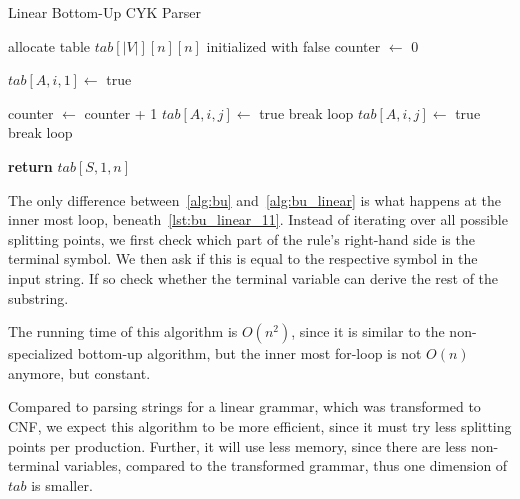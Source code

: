 \begin{algorithm}[H]
    \caption{Linear Bottom-Up CYK Parser}
    \label{alg:bu_linear}
    \begin{algorithmic}[1]
        \State allocate table $tab[|V|][n][n]$ initialized with false
        \State counter $\leftarrow$ 0
    
                \State $tab[A,i,1] \leftarrow$ true
            \EndFor
        \EndFor

                    \State counter $\leftarrow$ counter + 1 \label{lst:bu_linear_11}
                            \State $tab[A,i,j]\leftarrow$ true
                            \State break loop
                        \EndIf
                    \Else
                            \State $tab[A,i,j]\leftarrow$ true
                            \State break loop
                        \EndIf
                    \EndIf
                \EndFor
            \EndFor
        \EndFor

        \State \textbf{return} $tab[S,1,n]$
        \EndFunction
    \end{algorithmic}
\end{algorithm}

The only difference between~\cref{alg:bu} and~\cref{alg:bu_linear} is what happens at the inner most loop, beneath~\cref{lst:bu_linear_11}.
Instead of iterating over all possible splitting points, we first check which part of the rule's right-hand side is the terminal symbol.
We then ask if this is equal to the respective symbol in the input string.
If so check whether the terminal variable can derive the rest of the substring.

The running time of this algorithm is $O(n^2)$, since it is similar to the non-specialized bottom-up algorithm, but the inner most for-loop is not $O(n)$ anymore, but constant.

Compared to parsing strings for a linear grammar, which was transformed to CNF, we expect this algorithm to be more efficient, since it must try less splitting points per production.
Further, it will use less memory, since there are less non-terminal variables, compared to the transformed grammar, thus one dimension of $tab$ is smaller.

